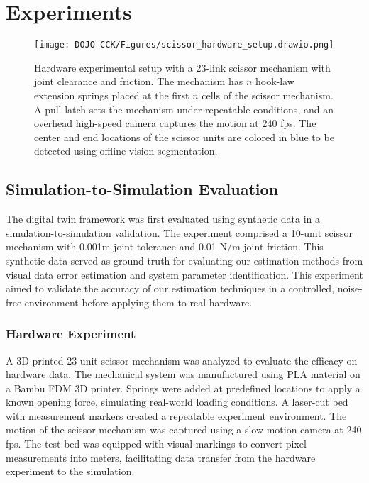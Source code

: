\section{Experiments} \label{experiments}
\begin{figure}[h]
    \centering
    \texttt{[image: DOJO-CCK/Figures/scissor\_hardware\_setup.drawio.png]}
    \caption{Hardware experimental setup with a 23-link scissor mechanism with joint clearance and friction. The mechanism has $n$ hook-law extension springs placed at the first $n$ cells of the scissor mechanism. A pull latch sets the mechanism under repeatable conditions, and an overhead high-speed camera captures the motion at 240 fps. The center and end locations of the scissor units are colored in blue to be detected using offline vision segmentation.}
    \label{fig:enter-label}
\end{figure}

\subsection{Simulation-to-Simulation Evaluation}

The digital twin framework was first evaluated using synthetic data in a simulation-to-simulation validation. The experiment comprised a 10-unit scissor mechanism with 0.001m joint tolerance and 0.01 N/m joint friction. This synthetic data served as ground truth for evaluating our estimation methods from visual data error estimation and system parameter identification. This experiment aimed to validate the accuracy of our estimation techniques in a controlled, noise-free environment before applying them to real hardware.

\subsubsection{Hardware Experiment}

A 3D-printed 23-unit scissor mechanism was analyzed to evaluate the efficacy on hardware data. The mechanical system was manufactured using PLA material on a Bambu FDM 3D printer. Springs were added at predefined locations to apply a known opening force, simulating real-world loading conditions. A laser-cut bed with measurement markers created a repeatable experiment environment. The motion of the scissor mechanism was captured using a slow-motion camera at 240 fps. The test bed was equipped with visual markings to convert pixel measurements into meters, facilitating data transfer from the hardware experiment to the simulation. 

